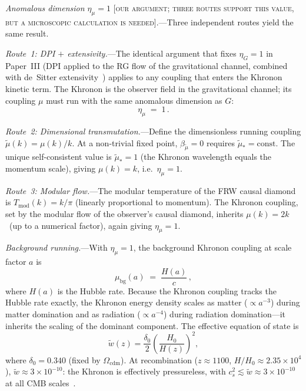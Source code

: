 \documentclass[prd,twocolumn,superscriptaddress,longbibliography,floatfix]{revtex4-2}
\newcommand{\Tmod}{T_{\mathrm{mod}}}
\begin{document}
\emph{Anomalous dimension $\eta_\mu = 1$}
[\textsc{our argument; three routes support this value,
but a microscopic calculation is needed}].---Three
independent routes yield the same result.

\emph{Route~1: DPI $+$ extensivity.}---The identical
argument that fixes $\eta_G = 1$ in Paper~III
(DPI applied to the RG flow of the gravitational
channel, combined with de~Sitter
extensivity~\cite{CasiniHuerta2017,Paper3}) applies to
any coupling that enters the Khronon kinetic term.
The Khronon is the observer field in the gravitational
channel; its coupling $\mu$ must run with the same
anomalous dimension as $G$:
\begin{equation}
\eta_\mu \;=\; 1\,.
\label{eq:eta_mu}
\end{equation}

\emph{Route~2: Dimensional transmutation.}---Define the
dimensionless running coupling
$\tilde{\mu}(k) = \mu(k)/k$.  At a non-trivial fixed
point, $\beta_{\tilde\mu} = 0$ requires
$\tilde{\mu}_* = \mathrm{const}$.  The unique
self-consistent value is $\tilde{\mu}_* = 1$ (the
Khronon wavelength equals the momentum scale),
giving $\mu(k) = k$, i.e.\ $\eta_\mu = 1$.

\emph{Route~3: Modular flow.}---The modular temperature
of the FRW causal diamond~\cite{AalsmaBak2025} is
$\Tmod(k) = k/\pi$ (linearly proportional to momentum).
The Khronon coupling, set by the modular flow of the
observer's causal diamond, inherits
$\mu(k) = 2k$~(up to a numerical factor), again giving
$\eta_\mu = 1$.

\emph{Background running.}---With $\eta_\mu = 1$, the
background Khronon coupling at scale factor $a$ is
\begin{equation}
\mu_{\mathrm{bg}}(a) \;=\; \frac{H(a)}{c}\,,
\label{eq:mu_running}
\end{equation}
where $H(a)$ is the Hubble rate.  Because the Khronon
coupling tracks the Hubble rate exactly, the Khronon
energy density scales as matter ($\propto a^{-3}$)
during matter domination and as radiation
($\propto a^{-4}$) during radiation domination---it
inherits the scaling of the dominant component.  The
effective equation of state is
\begin{equation}
\tilde{w}(z) = \frac{\delta_0}{2}
\!\left(\frac{H_0}{H(z)}\right)^{\!2},
\label{eq:w0_dust}
\end{equation}
where $\delta_0 = 0.340$ (fixed by $\Omega_{\mathrm{cdm}}$).
At recombination ($z \approx 1100$, $H/H_0 \approx 2.35
\times 10^4$), $\tilde{w} \approx 3 \times 10^{-10}$:
the Khronon is effectively pressureless, with
$c_s^2 \lesssim \tilde{w} \approx 3 \times 10^{-10}$
at all CMB scales~\cite{TKS2016}.
\end{document}
